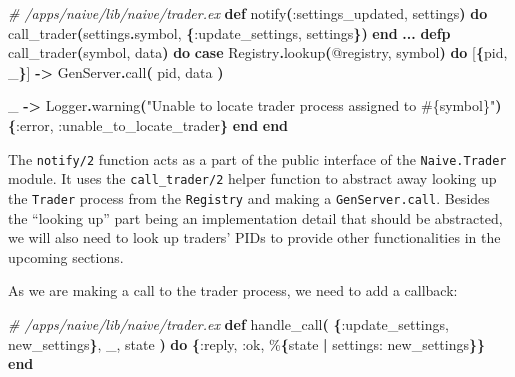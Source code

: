 \documentclass[
  oneside]{book}
\newenvironment{Shaded}{\begin{snugshade}}{\end{snugshade}}
\newcommand{\CommentTok}[1]{\textcolor[rgb]{0.56,0.35,0.01}{\textit{#1}}}
\newcommand{\ConstantTok}[1]{\textcolor[rgb]{0.56,0.35,0.01}{#1}}
\newcommand{\FunctionTok}[1]{\textcolor[rgb]{0.13,0.29,0.53}{\textbf{#1}}}
\newcommand{\KeywordTok}[1]{\textcolor[rgb]{0.13,0.29,0.53}{\textbf{#1}}}
\newcommand{\NormalTok}[1]{#1}
\newcommand{\OperatorTok}[1]{\textcolor[rgb]{0.81,0.36,0.00}{\textbf{#1}}}
\newcommand{\OtherTok}[1]{\textcolor[rgb]{0.56,0.35,0.01}{#1}}
\newcommand{\StringTok}[1]{\textcolor[rgb]{0.31,0.60,0.02}{#1}}
\newcommand{\VariableTok}[1]{\textcolor[rgb]{0.00,0.00,0.00}{#1}}
\begin{document}
\begin{Shaded}
\begin{Highlighting}[]
  \CommentTok{\# /apps/naive/lib/naive/trader.ex}
  \KeywordTok{def}\NormalTok{ notify}\FunctionTok{(}\VariableTok{:settings\_updated}\NormalTok{, settings}\FunctionTok{)} \KeywordTok{do}
\NormalTok{    call\_trader}\FunctionTok{(}\NormalTok{settings}\OperatorTok{.}\NormalTok{symbol, }\FunctionTok{\{}\VariableTok{:update\_settings}\NormalTok{, settings}\FunctionTok{\})}
  \KeywordTok{end}
  \OperatorTok{...}
  \KeywordTok{defp}\NormalTok{ call\_trader}\FunctionTok{(}\NormalTok{symbol, data}\FunctionTok{)} \KeywordTok{do}
    \KeywordTok{case} \ConstantTok{Registry}\OperatorTok{.}\NormalTok{lookup}\FunctionTok{(}\OtherTok{@registry}\NormalTok{, symbol}\FunctionTok{)} \KeywordTok{do}
      \OtherTok{[}\FunctionTok{\{}\NormalTok{pid, \_}\FunctionTok{\}}\OtherTok{]} \OperatorTok{{-}\textgreater{}}
        \ConstantTok{GenServer}\OperatorTok{.}\NormalTok{call}\FunctionTok{(}
\NormalTok{          pid,}
\NormalTok{          data}
        \FunctionTok{)}

\NormalTok{      \_ }\OperatorTok{{-}\textgreater{}}
        \ConstantTok{Logger}\OperatorTok{.}\NormalTok{warning}\FunctionTok{(}\StringTok{"Unable to locate trader process assigned to }\OtherTok{\#\{}\NormalTok{symbol}\OtherTok{\}}\StringTok{"}\FunctionTok{)}
        \FunctionTok{\{}\VariableTok{:error}\NormalTok{, }\VariableTok{:unable\_to\_locate\_trader}\FunctionTok{\}}
    \KeywordTok{end}
  \KeywordTok{end}
\end{Highlighting}
\end{Shaded}

The \texttt{notify/2} function acts as a part of the public interface of the \texttt{Naive.Trader} module. It uses the \texttt{call\_trader/2} helper function to abstract away looking up the \texttt{Trader} process from the \texttt{Registry} and making a \texttt{GenServer.call}. Besides the ``looking up'' part being an implementation detail that should be abstracted, we will also need to look up traders' PIDs to provide other functionalities in the upcoming sections.

As we are making a call to the trader process, we need to add a callback:

\begin{Shaded}
\begin{Highlighting}[]
  \CommentTok{\# /apps/naive/lib/naive/trader.ex}
  \KeywordTok{def}\NormalTok{ handle\_call}\FunctionTok{(}
        \FunctionTok{\{}\VariableTok{:update\_settings}\NormalTok{, new\_settings}\FunctionTok{\}}\NormalTok{,}
\NormalTok{        \_,}
\NormalTok{        state}
      \FunctionTok{)} \KeywordTok{do}
    \FunctionTok{\{}\VariableTok{:reply}\NormalTok{, }\VariableTok{:ok}\NormalTok{, \%}\FunctionTok{\{}\NormalTok{state }\OperatorTok{|} \VariableTok{settings:}\NormalTok{ new\_settings}\FunctionTok{\}\}}
  \KeywordTok{end}
\end{Highlighting}
\end{Shaded}
\end{document}
